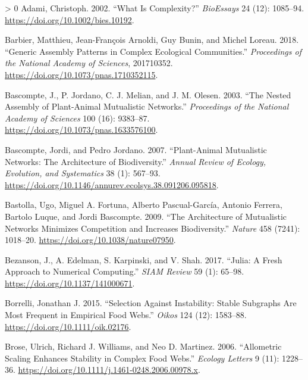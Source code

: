 \documentclass[10pt,oneside]{article}
\newlength{\cslhangindent}
\newenvironment{CSLReferences}[3] %
 {%
  \setlength{\parindent}{0pt}
  \ifodd #1 \everypar{\setlength{\hangindent}{\cslhangindent}}\ignorespaces\fi
  \ifnum #2 > 0
  \setlength{\parskip}{#2\baselineskip}
  \fi
 }%
 {}
\begin{document}
\hypertarget{refs}{}
\begin{CSLReferences}{1}{0}
\leavevmode\hypertarget{ref-Adami2002WhaCom}{}%
Adami, Christoph. 2002. {``What Is Complexity?''} \emph{BioEssays} 24
(12): 1085--94. \url{https://doi.org/10.1002/bies.10192}.

\leavevmode\hypertarget{ref-Barbier2018GenAss}{}%
Barbier, Matthieu, Jean-François Arnoldi, Guy Bunin, and Michel Loreau.
2018. {``Generic Assembly Patterns in Complex Ecological Communities.''}
\emph{Proceedings of the National Academy of Sciences}, 201710352.
\url{https://doi.org/10.1073/pnas.1710352115}.

\leavevmode\hypertarget{ref-Bascompte2003NesAss}{}%
Bascompte, J., P. Jordano, C. J. Melian, and J. M. Olesen. 2003. {``The
Nested Assembly of Plant-Animal Mutualistic Networks.''}
\emph{Proceedings of the National Academy of Sciences} 100 (16):
9383--87. \url{https://doi.org/10.1073/pnas.1633576100}.

\leavevmode\hypertarget{ref-Bascompte2007PlaMut}{}%
Bascompte, Jordi, and Pedro Jordano. 2007. {``Plant-Animal Mutualistic
Networks: The Architecture of Biodiversity.''} \emph{Annual Review of
Ecology, Evolution, and Systematics} 38 (1): 567--93.
\url{https://doi.org/10.1146/annurev.ecolsys.38.091206.095818}.

\leavevmode\hypertarget{ref-Bastolla2009ArcMut}{}%
Bastolla, Ugo, Miguel A. Fortuna, Alberto Pascual-García, Antonio
Ferrera, Bartolo Luque, and Jordi Bascompte. 2009. {``The Architecture
of Mutualistic Networks Minimizes Competition and Increases
Biodiversity.''} \emph{Nature} 458 (7241): 1018--20.
\url{https://doi.org/10.1038/nature07950}.

\leavevmode\hypertarget{ref-Bezanson2017JulFre}{}%
Bezanson, J., A. Edelman, S. Karpinski, and V. Shah. 2017. {``Julia: A
Fresh Approach to Numerical Computing.''} \emph{SIAM Review} 59 (1):
65--98. \url{https://doi.org/10.1137/141000671}.

\leavevmode\hypertarget{ref-Borrelli2015SelIns}{}%
Borrelli, Jonathan J. 2015. {``Selection Against Instability: Stable
Subgraphs Are Most Frequent in Empirical Food Webs.''} \emph{Oikos} 124
(12): 1583--88. \url{https://doi.org/10.1111/oik.02176}.

\leavevmode\hypertarget{ref-Brose2006AllSca}{}%
Brose, Ulrich, Richard J. Williams, and Neo D. Martinez. 2006.
{``Allometric Scaling Enhances Stability in Complex Food Webs.''}
\emph{Ecology Letters} 9 (11): 1228--36.
\url{https://doi.org/10.1111/j.1461-0248.2006.00978.x}.


\end{CSLReferences}
\end{document}
